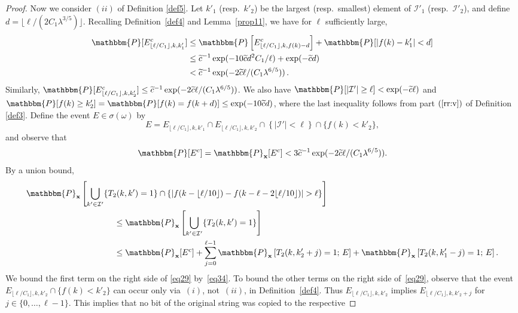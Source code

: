 \documentclass[final,12pt]{colt2018} %
\renewcommand{\P}{\mathbbm{P}}
\newcommand{\1}{\mathbf{1}}
\def\cI{\mathcal{I}}
\newcommand{\eqb}{\begin{equation}}
\newcommand{\eqe}{\end{equation}}
\newcommand{\eqbn}{\begin{equation*}}
\newcommand{\eqen}{\end{equation*}}
\newcommand{\wt}{\widetilde}
\def\x{{\bf x}}
\def\ct{{\wt c}}
\begin{document}
\begin{proof}
	Now we consider $(ii)$ of Definition \ref{def5}. Let $k'_1$ (resp.\ $k'_2$) be the largest (resp.\ smallest)
	element of $\cI'_1$ (resp.\ $\cI'_2$), and define $d = \lfloor \ell /
	(2C_1 \lambda^{3/5}) \rfloor$. Recalling Definition~\ref{def4} and
	Lemma~\ref{prop11}, we have for $\ell$ sufficiently large,
	\eqbn
	\begin{split}
		\P[ E_{\lfloor\ell/C_1\rfloor,k,k'_1}^c ]
		&\leq \P\left[ E_{\lfloor\ell/C_1\rfloor,k,f(k)-d }^c \right]
		+ \P[ |f(k)-k'_1|<d ]\\
		&\leq \ct^{-1}\exp(-10\ct d^2C_1/\ell) + \exp(- \ct d )\\
		&< \ct^{-1}\exp(-2\ct\ell/(C_1\lambda^{6/5})) \,.
	\end{split}
	\eqen
	Similarly, $\P [ E_{\lfloor \ell / C_1 \rfloor , k , k'_2}^c ]
	\leq \ct^{-1} \exp(-2 \ct \ell / (C_1\lambda^{6/5}))$.
	We also have $\P[ \left | \cI' \right| \geq \ell ] < \exp(-\ct \ell)$ and $\P[ f(k)\geq k'_2 ]=\P[ f(k)=f(k+d ) ] \leq \exp(-10\wt c d)$, where the last inequality follows from part $(\ref{rr:v})$ of Definition \ref{def3}. Define the event $E\in\sigma(\omega)$ by
	$$ E = E_{\lfloor \ell / C_1 \rfloor , k , k'_1} \cap
	E_{\lfloor\ell/C_1\rfloor,k,k'_2}\cap \left\{ \left| \cI'\right|
	< \ell \right\}
	\cap \{f(k)<k'_2 \}, $$
	and observe that
	\eqb
	\begin{split}
		\P[E^c]=\P_{\bf x}[E^c] < 3\ct^{-1}\exp(-2\ct\ell/(C_1\lambda^{6/5})).
	\end{split}
	\label{eq34}
	\eqe
	By a union bound,
	\eqb
	\begin{split}
		\P_{\x}&\left[ \bigcup_{k' \in \cI'} \{T_2(k,k')=1\}\cap \{|f(k-\lfloor \ell/10 \rfloor)-f(k-\ell-2\lfloor \ell/10 \rfloor)|>\ell\} \right]\\
		&\qquad\qquad \leq \P_{\x}\left[ \bigcup_{k' \in \cI'}
		\{T_2(k,k')=1\}\right]\\
		&\qquad\qquad \leq \P_\x[E^c]
		+ \sum_{j=0}^{\ell-1} \P_{\x}\left[T_2(k,k_2'+j)=1;\,E\right]
		+\P_{\x}\left[T_2(k,k_1'-j)=1;\,E\right].
	\end{split}
	\label{eq29}
	\eqe
	We bound the first term on the right side of \eqref{eq29}
	by~\eqref{eq34}.  To bound the other terms on the right side
	of~\eqref{eq29}, observe that the event $E_{\lfloor \ell / C_1 \rfloor , k , k'_2}\cap\{ f(k)<k'_2 \}$
	can occur only via~$(i)$, not~$(ii)$, in Definition~\ref{def4}.
	Thus $E_{\lfloor \ell / C_1 \rfloor , k , k'_2}$ implies
	$E_{\lfloor \ell / C_1 \rfloor , k , k'_2+j}$ for
	$j \in \{0 , \dots , \ell - 1 \}$.  This implies that no
	bit of the original string was copied to the respective

\end{proof}
\end{document}
